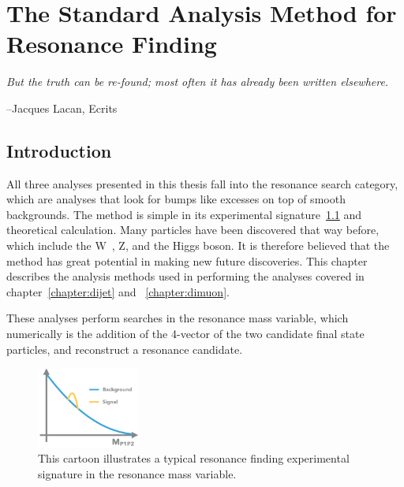 \chapter{The Standard Analysis Method for Resonance Finding}
\label{StandardAnalysisMethod}

\epigraph{\textit{But the truth can be re-found; most often it has already been written elsewhere.}}{--Jacques Lacan, Ecrits}



\section{Introduction}
All three analyses presented in this thesis fall into the resonance search category, which are analyses that look for bumps like excesses on top of smooth backgrounds. The method is simple in its experimental signature~\ref{fig:bump} and theoretical calculation. Many particles have been discovered that way before, which include the W~\cite{Arnison:142059}, Z, and the Higgs boson. It is therefore believed that the method has great potential in making new future discoveries. This chapter describes the analysis methods used in performing the analyses covered in chapter~\ref{chapter:dijet} and ~\ref{chapter:dimuon}. 


These analyses perform searches in the resonance mass variable, which numerically is the addition of the 4-vector of the two candidate final state particles, and reconstruct a resonance candidate. 

\begin{figure}[!htb]
    \begin{center}
        \includegraphics[width=0.3\textwidth]{figures/chapter_analysismethod/resonance}
        \caption{
            This cartoon illustrates a typical resonance finding experimental signature in the resonance mass variable. 
        }
        \label{fig:bump}
    \end{center}
\end{figure}
\FloatBarrier

